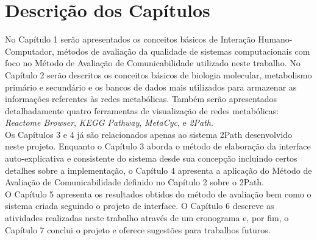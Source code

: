 \section*{Descrição dos Capítulos}
\indent No Capítulo 1 serão apresentados os conceitos básicos de Interação Humano-Computador, métodos de avaliação da qualidade de sistemas computacionais com foco no Método de Avaliação de Comunicabilidade utilizado neste trabalho.
\indent No Capítulo 2 serão descritos os conceitos básicos de biologia molecular, metabolismo primário e secundário e os bancos de dados mais utilizados para armazenar as informações referentes às redes metabólicas. Também serão apresentados detalhadamente quatro ferramentas de visualização de redes metabólicas: \textit{Reactome Browser}, \textit{KEGG Pathway}, \textit{MetaCyc}, e \textit{2Path}. \\ 
\indent Os Capítulos 3 e 4 já são relacionados apenas ao sistema 2Path desenvolvido neste projeto. Enquanto o Capítulo 3 aborda o método de elaboração da interface auto-explicativa e consistente do sistema desde sua concepção incluindo certos detalhes sobre a implementação, o Capítulo 4 apresenta a aplicação do Método de Avaliação de Comunicabilidade definido no Capítulo 2 sobre o 2Path. \\
\indent O Capítulo 5 apresenta os resultados obtidos do método de avaliação bem como o sistema criada seguindo o projeto de interface. O Capítulo 6 descreve as atividades realizadas neste trabalho através de um cronograma e, por fim, o Capítulo 7 conclui o projeto e oferece sugestões para trabalhos futuros.